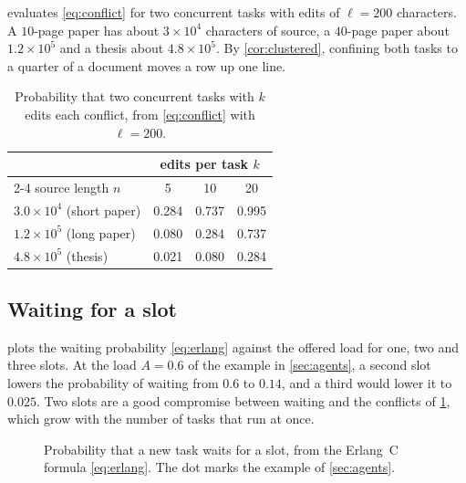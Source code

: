  evaluates \cref{eq:conflict} for two concurrent tasks with
edits of $\ell = 200$ characters. A $10$-page paper has about
$3 \times 10^{4}$ characters of source, a $40$-page paper about
$1.2 \times 10^{5}$ and a thesis about $4.8 \times 10^{5}$. By
\cref{cor:clustered}, confining both tasks to a quarter of a document moves a
row up one line.

\begin{table}[t]
\centering
\caption{Probability that two concurrent tasks with $k$ edits each conflict,
from \cref{eq:conflict} with $\ell = 200$.}
\label{tab:conflicts}
\begin{tabular}{@{}lccc@{}}
\toprule
& \multicolumn{3}{c}{edits per task $k$} \\
\cmidrule(l){2-4}
source length $n$ & 5 & 10 & 20 \\
\midrule
$3.0 \times 10^{4}$ (short paper) & 0.284 & 0.737 & 0.995 \\
$1.2 \times 10^{5}$ (long paper) & 0.080 & 0.284 & 0.737 \\
$4.8 \times 10^{5}$ (thesis) & 0.021 & 0.080 & 0.284 \\
\bottomrule
\end{tabular}
\end{table}

\subsection{Waiting for a slot}

 plots the waiting probability \cref{eq:erlang} against the
offered load for one, two and three slots. At the load $A = 0.6$ of the example
in \cref{sec:agents}, a second slot lowers the probability of waiting from
$0.6$ to $0.14$, and a third would lower it to $0.025$. Two slots are a good
compromise between waiting and the conflicts of \cref{tab:conflicts}, which
grow with the number of tasks that run at once.

\begin{figure}[t]
\centering
{}
\caption{Probability that a new task waits for a slot, from the Erlang~C
formula \cref{eq:erlang}. The dot marks the example of \cref{sec:agents}.}
\label{fig:erlang}
\end{figure}

